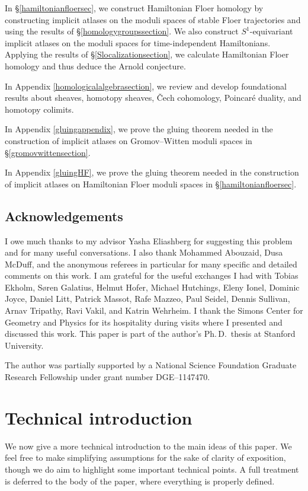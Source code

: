 \documentclass[12pt]{article}
\theoremstyle{definition}
\theoremstyle{remark}
\numberwithin{equation}{subsection}
\begin{document}
In \S\ref{hamiltonianfloersec}, we construct Hamiltonian Floer homology by constructing implicit atlases on the moduli spaces of stable Floer trajectories and using the results of \S\ref{homologygroupssection}.  We also construct $S^1$-equivariant implicit atlases on the moduli spaces for time-independent Hamiltonians.  Applying the results of \S\ref{Slocalizationsection}, we calculate Hamiltonian Floer homology and thus deduce the Arnold conjecture.

In Appendix \ref{homologicalalgebrasection}, we review and develop foundational results about sheaves, homotopy sheaves, \v Cech cohomology, Poincar\'e duality, and homotopy colimits.

In Appendix \ref{gluingappendix}, we prove the gluing theorem needed in the construction of implicit atlases on Gromov--Witten moduli spaces in \S\ref{gromovwittensection}.

In Appendix \ref{gluingHF}, we prove the gluing theorem needed in the construction of implicit atlases on Hamiltonian Floer moduli spaces in \S\ref{hamiltonianfloersec}.

\subsection{Acknowledgements}

I owe much thanks to my advisor Yasha Eliashberg for suggesting this problem and for many useful conversations.  I also thank Mohammed Abouzaid, Dusa McDuff, and the anonymous referees in particular for many specific and detailed comments on this work.  I am grateful for the useful exchanges I had with Tobias Ekholm, S\o ren Galatius, Helmut Hofer, Michael Hutchings, Eleny Ionel, Dominic Joyce, Daniel Litt, Patrick Massot, Rafe Mazzeo, Paul Seidel, Dennis Sullivan, Arnav Tripathy, Ravi Vakil, and Katrin Wehrheim.  I thank the Simons Center for Geometry and Physics for its hospitality during visits where I presented and discussed this work.  This paper is part of the author's Ph.\,D.\ thesis at Stanford University.

The author was partially supported by a National Science Foundation Graduate Research Fellowship under grant number DGE--1147470.

\section{Technical introduction}\label{technicalintrosection}

We now give a more technical introduction to the main ideas of this paper.  We feel free to make simplifying assumptions for the sake of clarity of exposition, though we do aim to highlight some important technical points.  A full treatment is deferred to the body of the paper, where everything is properly defined.
\end{document}
